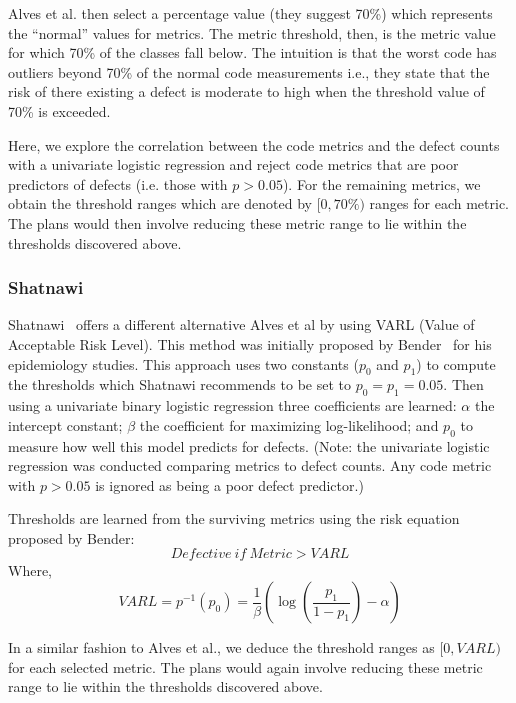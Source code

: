 \documentclass[10pt,journal,compsoc]{IEEEtran}
\begin{document}
Alves et al. then select a percentage value (they suggest 70\%) which 
represents the ``normal'' values for metrics. The metric threshold, then, 
is the metric value for which 70\% of the classes fall below. The 
intuition  is that the worst code has outliers beyond 70\% of the normal 
code measurements i.e., they state that the risk of there existing a defect 
is moderate to high when the threshold value of 70\% is exceeded.

Here, we explore the correlation between the code metrics 
and the defect counts with a univariate logistic regression and  reject 
code metrics that are poor predictors of defects (i.e.   those  with $p > 
0.05$). For the remaining metrics, we obtain the threshold ranges which are denoted by $[0,70\%)$ ranges for each metric. The plans would then involve reducing these metric range to lie within the thresholds discovered above.

\subsubsection{Shatnawi}

Shatnawi~\cite{shatnawi} offers a different alternative Alves et al by using VARL (Value of Acceptable Risk Level). This method was 
initially proposed by Bender~\cite{bender99} for his epidemiology studies.  This approach uses two
constants ($p_0$ and $p_1$) to compute the thresholds which Shatnawi recommends to be set to
$p_0=p_1=0.05$. 
Then using a univariate binary logistic regression three 
coefficients are learned:
$\alpha$ the intercept constant;
$\beta$ the coefficient for maximizing log-likelihood;
and $p_0$ to 
measure how well this  model predicts for defects. (Note: the univariate 
logistic regression was conducted comparing metrics to defect counts. Any 
code metric with $p>0.05$ is ignored as being a poor defect predictor.)

Thresholds are learned from the surviving metrics  using
the risk equation proposed by Bender:
$$ \mathit{Defective\ if}\ Metric > VARL$$
Where,
\begin{equation*}
	VARL = p^{-1}(p_0) =  \frac{1}{\beta }\left( {\log \left( 
		{\frac{{{p_1}}}{{1 - {p_1}}}} \right) - \alpha } \right)
\end{equation*}

In a similar fashion to Alves et al., we deduce the threshold ranges as $[0, VARL)$ for each selected metric. The plans would again involve reducing these metric range to lie within the thresholds discovered above.
\end{document}
